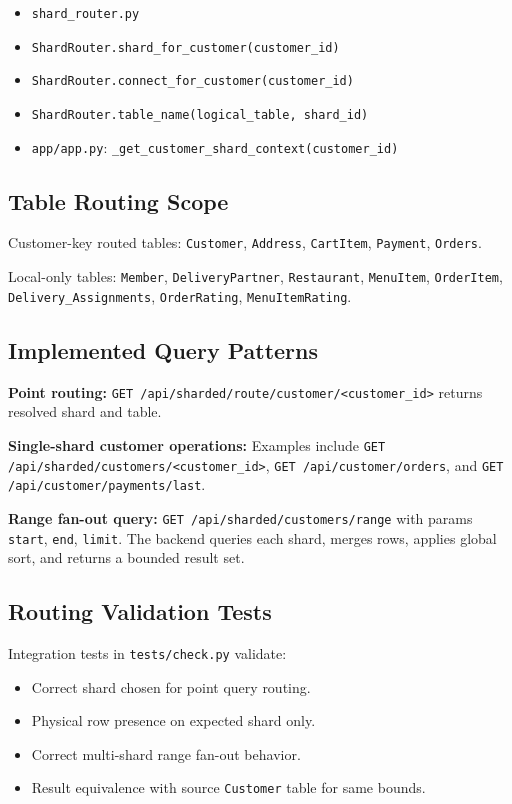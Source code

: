 \documentclass[12pt,a4paper]{article}
\begin{document}
\begin{itemize}[leftmargin=*]
  \item \texttt{shard\_router.py}
  \item \texttt{ShardRouter.shard\_for\_customer(customer\_id)}
  \item \texttt{ShardRouter.connect\_for\_customer(customer\_id)}
  \item \texttt{ShardRouter.table\_name(logical\_table, shard\_id)}
  \item \texttt{app/app.py}: \texttt{\_get\_customer\_shard\_context(customer\_id)}
\end{itemize}

\subsection{Table Routing Scope}

Customer-key routed tables:
\texttt{Customer}, \texttt{Address}, \texttt{CartItem}, \texttt{Payment}, \texttt{Orders}.

Local-only tables:
\texttt{Member}, \texttt{DeliveryPartner}, \texttt{Restaurant}, \texttt{MenuItem},
\texttt{OrderItem}, \texttt{Delivery\_Assignments}, \texttt{OrderRating}, \texttt{MenuItemRating}.

\subsection{Implemented Query Patterns}

\textbf{Point routing:}
\texttt{GET /api/sharded/route/customer/<customer\_id>} returns resolved shard and table.

\textbf{Single-shard customer operations:}
Examples include
\texttt{GET /api/sharded/customers/<customer\_id>},
\texttt{GET /api/customer/orders}, and
\texttt{GET /api/customer/payments/last}.

\textbf{Range fan-out query:}
\texttt{GET /api/sharded/customers/range} with params
\texttt{start}, \texttt{end}, \texttt{limit}.
The backend queries each shard, merges rows, applies global sort, and returns a bounded
result set.

\subsection{Routing Validation Tests}

Integration tests in \texttt{tests/check.py} validate:

\begin{itemize}[leftmargin=*]
  \item Correct shard chosen for point query routing.
  \item Physical row presence on expected shard only.
  \item Correct multi-shard range fan-out behavior.
  \item Result equivalence with source \texttt{Customer} table for same bounds.
\end{itemize}
\end{document}

